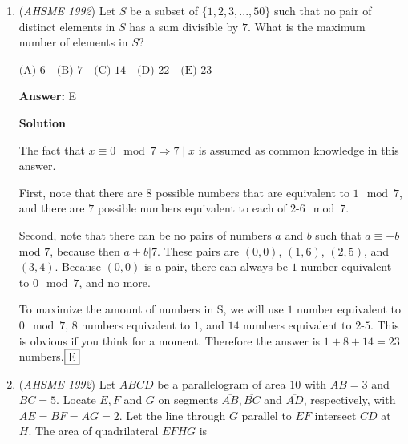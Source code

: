 \begin{enumerate}
 $\text{(A) } 250\quad \text{(B) } 450\quad \text{(C) } 500\quad \text{(D) } 1250\quad \text{(E) } 2500$

 \textbf{Answer: }B



\textbf{Solution}

$\fbox{B}$ We can pick any two points on the $x$-axis and any two points on the $y$-axis to form a quadrilateral, and the intersection of its diagonals will thus definitely be inside the first quadrant. Hence the answer is $\binom{10}{2} \times \binom{5}{2} = 450$.

 


	\item (\textit{AHSME 1992}) Let $S$ be a subset of $\{1,2,3,...,50\}$ such that no pair of distinct elements in $S$ has a sum divisible by $7$. What is the maximum number of elements in $S$?


 $\text{(A) } 6\quad \text{(B) } 7\quad \text{(C) } 14\quad \text{(D) } 22\quad \text{(E) } 23$

 \textbf{Answer: }E



\textbf{Solution}

The fact that $x \equiv 0 \mod 7 \Rightarrow 7 \mid x$ is assumed as common knowledge in this answer.

 First, note that there are $8$ possible numbers that are equivalent to $1 \mod 7$, and there are $7$ possible numbers equivalent to each of $2$-$6 \mod 7$.

 Second, note that there can be no pairs of numbers $a$ and $b$ such that $a \equiv -b$ mod $7$, because then $a+b | 7$. These pairs are $(0,0)$, $(1,6)$, $(2,5)$, and $(3,4)$. Because $(0,0)$ is a pair, there can always be $1$ number equivalent to $0 \mod 7$, and no more.

 To maximize the amount of numbers in S, we will use $1$ number equivalent to $0 \mod 7$, $8$ numbers equivalent to $1$, and $14$ numbers equivalent to $2$-$5$. This is obvious if you think for a moment. Therefore the answer is $1+8+14=23$ numbers.$\fbox{E}$



	\item (\textit{AHSME 1992}) Let $ABCD$ be a parallelogram of area $10$ with $AB=3$ and $BC=5$. Locate $E,F$ and $G$ on segments $\overline{AB},\overline{BC}$ and $\overline{AD}$, respectively, with $AE=BF=AG=2$. Let the line through $G$ parallel to $\overline{EF}$ intersect $\overline{CD}$ at $H$. The area of quadrilateral $EFHG$ is



\end{enumerate}

